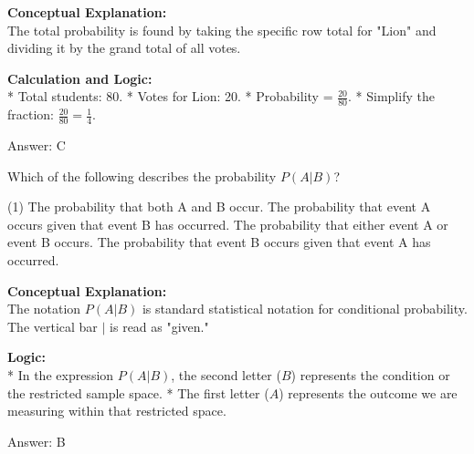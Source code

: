 \documentclass[11pt,paper=a4,answers]{exam}
\begin{document}
\begin{questions}
\begin{solution}
\textbf{Conceptual Explanation:} \\
The total probability is found by taking the specific row total for "Lion" and dividing it by the grand total of all votes.

\vspace{30pt}

\textbf{Calculation and Logic:} \\
* Total students: 80.
* Votes for Lion: 20.
* Probability = $\frac{20}{80}$.
* Simplify the fraction: $\frac{20}{80} = \frac{1}{4}$.

\vspace{30pt}

Answer: \colorbox{yellow!100}{C}
\end{solution}

\vspace{60pt}

\question
Which of the following describes the probability $P(A|B)$?
\begin{tasks}(1)
    \task The probability that both A and B occur.
    \task The probability that event A occurs given that event B has occurred.
    \task The probability that either event A or event B occurs.
    \task The probability that event B occurs given that event A has occurred.
\end{tasks}

\begin{solution}
\textbf{Conceptual Explanation:} \\
The notation $P(A|B)$ is standard statistical notation for conditional probability. The vertical bar $|$ is read as "given."

\vspace{30pt}

\textbf{Logic:} \\
* In the expression $P(A|B)$, the second letter ($B$) represents the condition or the restricted sample space.
* The first letter ($A$) represents the outcome we are measuring within that restricted space.

\vspace{30pt}

Answer: \colorbox{yellow!100}{B}
\end{solution}

\vspace{60pt}


\end{questions}
\end{document}
